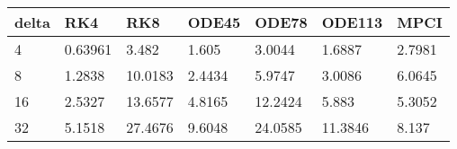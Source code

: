 \begin{tabular}{lllllll}
delta & RK4 & RK8 & ODE45 & ODE78 & ODE113 & MPCI \\ 
\hline 
4 & 0.63961 & 3.482 & 1.605 & 3.0044 & 1.6887 & 2.7981 \\ 
8 & 1.2838 & 10.0183 & 2.4434 & 5.9747 & 3.0086 & 6.0645 \\ 
16 & 2.5327 & 13.6577 & 4.8165 & 12.2424 & 5.883 & 5.3052 \\ 
32 & 5.1518 & 27.4676 & 9.6048 & 24.0585 & 11.3846 & 8.137 \\ 
\hline 
\end{tabular}